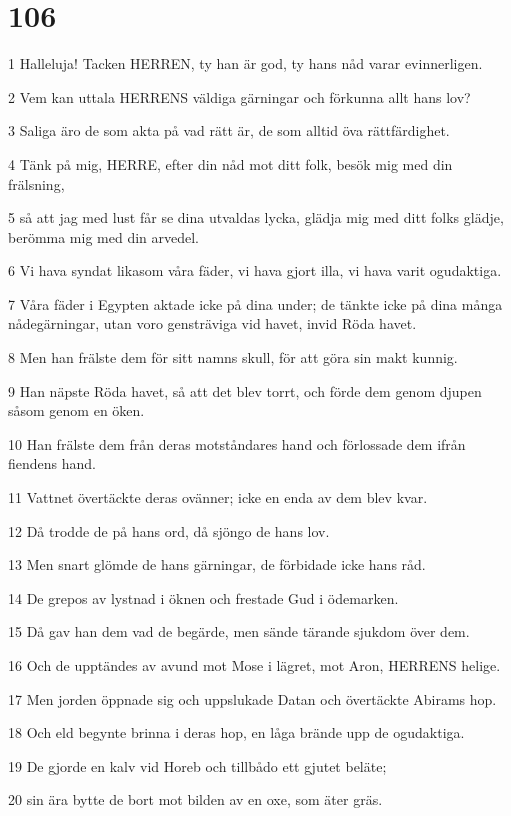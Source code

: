 \chapter{106}

\par 1 Halleluja! Tacken HERREN, ty han är god, ty hans nåd varar evinnerligen.
\par 2 Vem kan uttala HERRENS väldiga gärningar och förkunna allt hans lov?
\par 3 Saliga äro de som akta på vad rätt är, de som alltid öva rättfärdighet.
\par 4 Tänk på mig, HERRE, efter din nåd mot ditt folk, besök mig med din frälsning,
\par 5 så att jag med lust får se dina utvaldas lycka, glädja mig med ditt folks glädje, berömma mig med din arvedel.
\par 6 Vi hava syndat likasom våra fäder, vi hava gjort illa, vi hava varit ogudaktiga.
\par 7 Våra fäder i Egypten aktade icke på dina under; de tänkte icke på dina många nådegärningar, utan voro gensträviga vid havet, invid Röda havet.
\par 8 Men han frälste dem för sitt namns skull, för att göra sin makt kunnig.
\par 9 Han näpste Röda havet, så att det blev torrt, och förde dem genom djupen såsom genom en öken.
\par 10 Han frälste dem från deras motståndares hand och förlossade dem ifrån fiendens hand.
\par 11 Vattnet övertäckte deras ovänner; icke en enda av dem blev kvar.
\par 12 Då trodde de på hans ord, då sjöngo de hans lov.
\par 13 Men snart glömde de hans gärningar, de förbidade icke hans råd.
\par 14 De grepos av lystnad i öknen och frestade Gud i ödemarken.
\par 15 Då gav han dem vad de begärde, men sände tärande sjukdom över dem.
\par 16 Och de upptändes av avund mot Mose i lägret, mot Aron, HERRENS helige.
\par 17 Men jorden öppnade sig och uppslukade Datan och övertäckte Abirams hop.
\par 18 Och eld begynte brinna i deras hop, en låga brände upp de ogudaktiga.
\par 19 De gjorde en kalv vid Horeb och tillbådo ett gjutet beläte;
\par 20 sin ära bytte de bort mot bilden av en oxe, som äter gräs.
